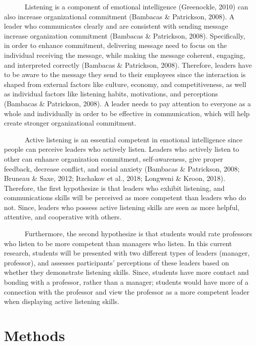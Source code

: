 \documentclass[
  12pt,
]{article}
\begin{document}
~~~~~~Listening is a component of emotional intelligence (Greenockle, 2010) can also increase organizational commitment (Bambacas \& Patrickson, 2008). A leader who communicates clearly and are consistent with sending message increase organization commitment (Bambacas \& Patrickson, 2008). Specifically, in order to enhance commitment, delivering message need to focus on the individual receiving the message, while making the message coherent, engaging, and interpreted correctly (Bambacas \& Patrickson, 2008). Therefore, leaders have to be aware to the message they send to their employees since the interaction is shaped from external factors like culture, economy, and competitiveness, as well as individual factors like listening habits, motivations, and perceptions (Bambacas \& Patrickson, 2008). A leader needs to pay attention to everyone as a whole and individually in order to be effective in communication, which will help create stronger organizational commitment.

~~~~~~Active listening is an essential competent in emotional intelligence since people can perceive leaders who actively listen. Leaders who actively listen to other can enhance organization commitment, self-awareness, give proper feedback, decrease conflict, and social anxiety (Bambacas \& Patrickson, 2008; Bruneau \& Saxe, 2012; Itzchakov et al., 2018; Longweni \& Kroon, 2018). Therefore, the first hypothesize is that leaders who exhibit listening, and communications skills will be perceived as more competent than leaders who do not. Since, leaders who possess active listening skills are seen as more helpful, attentive, and cooperative with others.

~~~~~~Furthermore, the second hypothesize is that students would rate professors who listen to be more competent than managers who listen. In this current research, students will be presented with two different types of leaders (manager, professor), and assesses participants' perceptions of these leaders based on whether they demonstrate listening skills. Since, students have more contact and bonding with a professor, rather than a manager; students would have more of a connection with the professor and view the professor as a more competent leader when displaying active listening skills.

\newpage

\hypertarget{methods}{%
\section{Methods}\label{methods}}
\end{document}
